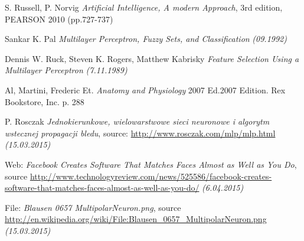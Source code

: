 \begin{thebibliography}{9}
     
    S. Russell, P. Norvig
    \emph{Artificial Intelligence, A modern Approach},
    3rd edition, PEARSON 2010 (pp.727-737)
    
    Sankar K. Pal
    \emph{Multilayer Perceptron, Fuzzy Sets, and Classification}
    \emph{(09.1992)}
    
    Dennis W. Ruck, Steven K. Rogers, Matthew Kabrisky
    \emph{Feature Selection Using a Multilayer Perceptron}
    \emph{(7.11.1989)}
    
    Al, Martini, Frederic Et.
    \emph{Anatomy and Physiology}
    2007 Ed.2007 Edition. Rex Bookstore, Inc. p. 288  
    
     P. Rosczak
     \emph{Jednokierunkowe, wielowarstwowe sieci neuronowe i algorytm wstecznej propagacji bledu},
     source: \url{http://www.rosczak.com/mlp/mlp.html}
     \emph{(15.03.2015)}
    
    Web: \emph{Facebook Creates Software That Matches Faces Almost as Well as You Do},
    source \url{http://www.technologyreview.com/news/525586/facebook-creates-software-that-matches-faces-almost-as-well-as-you-do/}
    \emph{(6.04.2015)}
  
    File: \emph{Blausen 0657 MultipolarNeuron.png},
    source \url{http://en.wikipedia.org/wiki/File:Blausen_0657_MultipolarNeuron.png}
    \emph{(15.03.2015)}

\end{thebibliography}